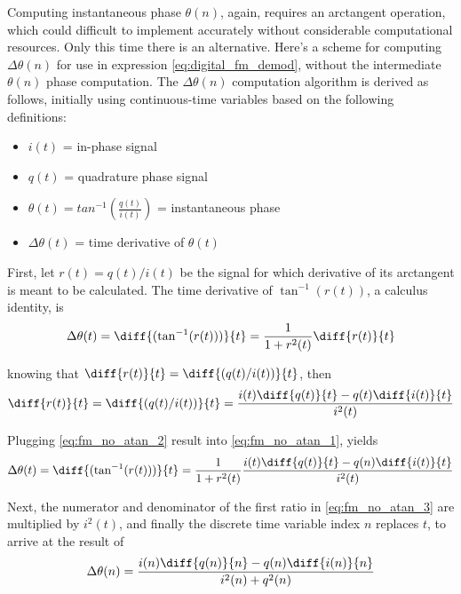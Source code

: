 Computing instantaneous phase $\theta(n)$, again, requires an arctangent operation, which could difficult to implement accurately without considerable computational resources. Only this time there is an alternative. Here's a scheme for computing $\Delta\theta(n)$ for use in expression \eqref{eq:digital_fm_demod}, without the intermediate $\theta(n)$ phase computation. The $\Delta\theta(n)$ computation algorithm is derived as follows, initially using continuous-time variables based on the following definitions:
\begin{itemize}
  \item $i(t)$ = in-phase signal
  \item $q(t)$ = quadrature phase signal
  \item $\theta(t) = tan^{-1}\left(\frac{q(t)}{i(t)}\right)$ = instantaneous phase
  \item $\Delta\theta(t)$ = time derivative of $\theta(t)$
\end{itemize}

First, let $r(t)=q(t)/i(t)$  be the signal for which derivative of its arctangent is meant to be calculated. The time derivative of $\tan^{-1}(r(t))$, a calculus identity, is
\begin{equation} \label{eq:fm_no_atan_1}
  \Delta\theta(t) = \diff{(\tan^{-1}(r(t)))}{t}=\frac{1}{1+r^2(t)}\diff{r(t)}{t}
\end{equation}

knowing that $\diff{r(t)}{t}=\diff{(q(t)/i(t))}{t}$, then
\begin{equation} \label{eq:fm_no_atan_2}
  \diff{r(t)}{t} = \diff{(q(t)/i(t))}{t} = \frac{i(t)\diff{q(t)}{t}-q(t)\diff{i(t)}{t}}{i^2(t)}
\end{equation}

Plugging \eqref{eq:fm_no_atan_2} result into \eqref{eq:fm_no_atan_1}, yields
\begin{equation} \label{eq:fm_no_atan_3}
  \Delta\theta(t) = \diff{(\tan^{-1}(r(t)))}{t}=\frac{1}{1+r^2(t)}\frac{i(t)\diff{q(t)}{t}-q(n)\diff{i(t)}{t}}{i^2(t)}
\end{equation}

Next, the numerator and denominator of the first ratio in \eqref{eq:fm_no_atan_3} are multiplied by $i^2(t)$, and finally the discrete time variable index $n$ replaces $t$, to arrive at the result of
\begin{equation} \label{eq:fm_no_atan_4}
    \Delta\theta(n)= \frac{i(n)\diff{q(n)}{n}-q(n)\diff{i(n)}{n}}{i^2(n)+q^2(n)}
\end{equation}

